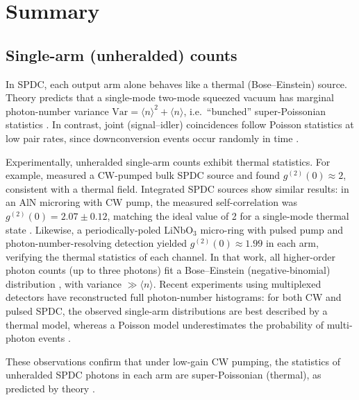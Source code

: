 
\section{Summary}

\subsection*{Single-arm (unheralded) counts}
In SPDC, each output arm alone behaves like a thermal (Bose--Einstein) source. Theory predicts that a single-mode two-mode squeezed vacuum has marginal photon-number variance 
$\mathrm{Var}=\langle n\rangle^2+\langle n\rangle$, i.e.\ ``bunched'' super-Poissonian statistics \cite{christProbingMultimodeSqueezing2011}. In contrast, joint (signal--idler) coincidences follow Poisson statistics at low pair rates, since downconversion events occur randomly in time \cite{avenhausPhotonNumberStatistics2008,christProbingMultimodeSqueezing2011}.

Experimentally, unheralded single-arm counts exhibit thermal statistics. For example, \cite{blauensteinerPhotonBunchingParametric2009} measured a CW-pumped bulk SPDC source and found $g^{(2)}(0)\approx2$, consistent with a thermal field. Integrated SPDC sources show similar results: in an AlN microring with CW pump, the measured self-correlation was $g^{(2)}(0)=2.07\pm0.12$, matching the ideal value of 2 for a single-mode thermal state \cite{guoParametricDownconversionPhotonpair2016}. Likewise, a periodically-poled LiNbO$_3$ micro-ring with pulsed pump and photon-number-resolving detection yielded $g^{(2)}(0)\approx1.99$ in each arm, verifying the thermal statistics of each channel. In that work, all higher-order photon counts (up to three photons) fit a Bose--Einstein (negative-binomial) distribution \cite{christProbingMultimodeSqueezing2011}, with variance $\gg \langle n\rangle$. Recent experiments using multiplexed detectors have reconstructed full photon-number histograms: for both CW and pulsed SPDC, the observed single-arm distributions are best described by a thermal model, whereas a Poisson model underestimates the probability of multi-photon events \cite{christProbingMultimodeSqueezing2011}.

These observations confirm that under low-gain CW pumping, the statistics of unheralded SPDC photons in each arm are super-Poissonian (thermal), as predicted by theory \cite{avenhausPhotonNumberStatistics2008,christProbingMultimodeSqueezing2011}.

